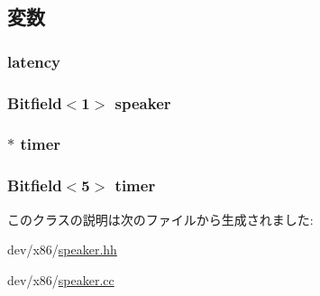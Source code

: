 \subsection{変数}
\hypertarget{classX86ISA_1_1Speaker_ac8d8966078cc047949fd1bca8feb21b6}{
\subsubsection[{latency}]{ {\bf latency}}}
\label{classX86ISA_1_1Speaker_ac8d8966078cc047949fd1bca8feb21b6}
\hypertarget{classX86ISA_1_1Speaker_a3791b579002f3ffc8a2752a2d711e46e}{
\subsubsection[{speaker}]{\setlength{\rightskip}{0pt plus 5cm}Bitfield$<$1$>$ {\bf speaker}}}
\label{classX86ISA_1_1Speaker_a3791b579002f3ffc8a2752a2d711e46e}
\hypertarget{classX86ISA_1_1Speaker_aab951a332e224dfaad6bf461353dc1ce}{
\subsubsection[{timer}]{$\ast$ {\bf timer}}}
\label{classX86ISA_1_1Speaker_aab951a332e224dfaad6bf461353dc1ce}
\hypertarget{classX86ISA_1_1Speaker_a0d840ef312b28548436ba3651064f023}{
\subsubsection[{timer}]{\setlength{\rightskip}{0pt plus 5cm}Bitfield$<$5$>$ {\bf timer}}}
\label{classX86ISA_1_1Speaker_a0d840ef312b28548436ba3651064f023}


このクラスの説明は次のファイルから生成されました:\begin{DoxyCompactItemize}
\item 
dev/x86/\hyperlink{speaker_8hh}{speaker.hh}\item 
dev/x86/\hyperlink{speaker_8cc}{speaker.cc}\end{DoxyCompactItemize}
